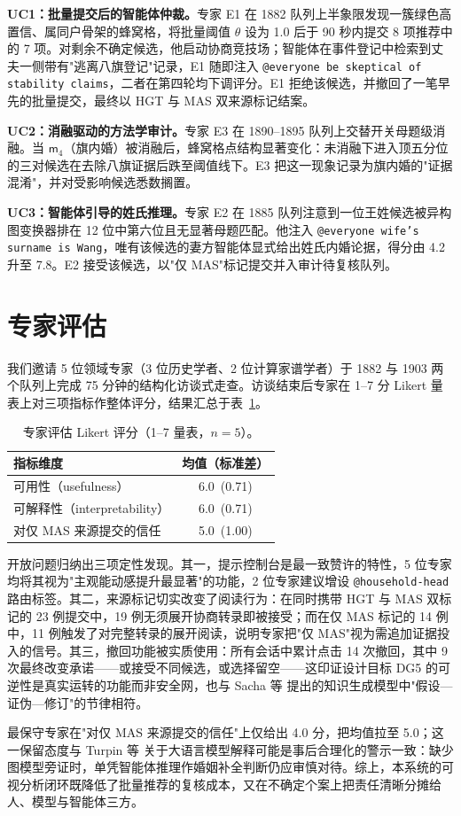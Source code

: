 \textbf{UC1：批量提交后的智能体仲裁。}专家 E1 在 1882 队列上半象限发现一簇绿色高置信、属同户骨架的蜂窝格，将批量阈值 \(\theta\) 设为 1.0 后于 90 秒内提交 8 项推荐中的 7 项。对剩余不确定候选，他启动协商竞技场；智能体在事件登记中检索到丈夫一侧带有"逃离八旗登记"记录，E1 随即注入 \texttt{@everyone be skeptical of stability claims}，二者在第四轮均下调评分。E1 拒绝该候选，并撤回了一笔早先的批量提交，最终以 HGT 与 MAS 双来源标记结案。

\textbf{UC2：消融驱动的方法学审计。}专家 E3 在 1890–1895 队列上交替开关母题级消融。当 \(\mathsf{m}_4\)（旗内婚）被消融后，蜂窝格点结构显著变化：未消融下进入顶五分位的三对候选在去除八旗证据后跌至阈值线下。E3 把这一现象记录为旗内婚的"证据混淆"，并对受影响候选悉数搁置。

\textbf{UC3：智能体引导的姓氏推理。}专家 E2 在 1885 队列注意到一位王姓候选被异构图变换器排在 12 位中第六位且无显著母题匹配。他注入 \texttt{@everyone wife's surname is Wang}，唯有该候选的妻方智能体显式给出姓氏内婚论据，得分由 4.2 升至 7.8。E2 接受该候选，以"仅 MAS"标记提交并入审计待复核队列。

\section{专家评估}\label{sec:case-expert}

我们邀请 5 位领域专家（3 位历史学者、2 位计算家谱学者）于 1882 与 1903 两个队列上完成 75 分钟的结构化访谈式走查。访谈结束后专家在 1–7 分 Likert 量表上对三项指标作整体评分，结果汇总于表~\ref{tab:expert-likert}。

\begin{table}[h]
  \centering
  \caption{专家评估 Likert 评分（1--7 量表，$n=5$）。}
  \label{tab:expert-likert}
  \begin{tabular}{lc}
    \toprule
    指标维度 & 均值（标准差）\\
    \midrule
    可用性（usefulness） & 6.0~(0.71) \\
    可解释性（interpretability） & 6.0~(0.71) \\
    对仅 MAS 来源提交的信任 & 5.0~(1.00) \\
    \bottomrule
  \end{tabular}
\end{table}

开放问题归纳出三项定性发现。其一，提示控制台是最一致赞许的特性，5 位专家均将其视为"主观能动感提升最显著"的功能，2 位专家建议增设 \texttt{@household-head} 路由标签。其二，来源标记切实改变了阅读行为：在同时携带 HGT 与 MAS 双标记的 23 例提交中，19 例无须展开协商转录即被接受；而在仅 MAS 标记的 14 例中，11 例触发了对完整转录的展开阅读，说明专家把"仅 MAS"视为需追加证据投入的信号。其三，撤回功能被实质使用：所有会话中累计点击 14 次撤回，其中 9 次最终改变承诺——或接受不同候选，或选择留空——这印证设计目标 DG5 的可逆性是真实运转的功能而非安全网，也与 Sacha 等\citep{sacha2014knowledge} 提出的知识生成模型中"假设—证伪—修订"的节律相符。

最保守专家在"对仅 MAS 来源提交的信任"上仅给出 4.0 分，把均值拉至 5.0；这一保留态度与 Turpin 等\citep{turpin2023faithfulness} 关于大语言模型解释可能是事后合理化的警示一致：缺少图模型旁证时，单凭智能体推理作婚姻补全判断仍应审慎对待。综上，本系统的可视分析闭环既降低了批量推荐的复核成本，又在不确定个案上把责任清晰分摊给人、模型与智能体三方。
